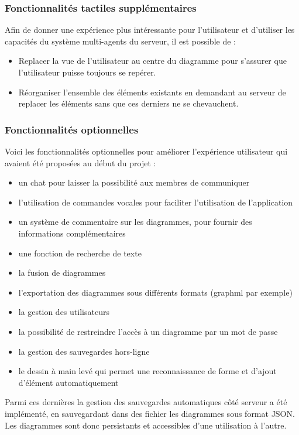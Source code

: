 \subsubsection{Fonctionnalités tactiles supplémentaires}
Afin de donner une expérience plus intéressante pour l'utilisateur et d'utiliser les capacités du système multi-agents du serveur, il est possible de :
\begin{itemize}
	\item Replacer la vue de l'utilisateur au centre du diagramme pour s'assurer que l'utilisateur puisse toujours se repérer.
	\item Réorganiser l'ensemble des éléments existants en demandant au serveur de replacer les éléments sans que ces derniers ne se chevauchent.
\end{itemize}

\subsubsection{Fonctionnalités optionnelles}
Voici les fonctionnalités optionnelles pour améliorer l'expérience utilisateur qui avaient été proposées au début du projet :
\begin{itemize}
\item un chat pour laisser la possibilité aux membres de communiquer
\item l'utilisation de commandes vocales pour faciliter l'utilisation de l'application
\item un système de commentaire sur les diagrammes, pour fournir des informations complémentaires
\item une fonction de recherche de texte
\item la fusion de diagrammes
\item l'exportation des diagrammes sous différents formats (graphml par exemple)
\item la gestion des utilisateurs
\item la possibilité de restreindre l'accès à un diagramme par un mot de passe
\item la gestion des sauvegardes hors-ligne
\item le dessin à main levé qui permet une reconnaissance de forme et d'ajout d'élément automatiquement
\end{itemize}

Parmi ces dernières la gestion des sauvegardes automatiques côté serveur a été implémenté, en sauvegardant dans des fichier les diagrammes sous format JSON. Les diagrammes sont donc persistants et accessibles d'une utilisation à l'autre.

